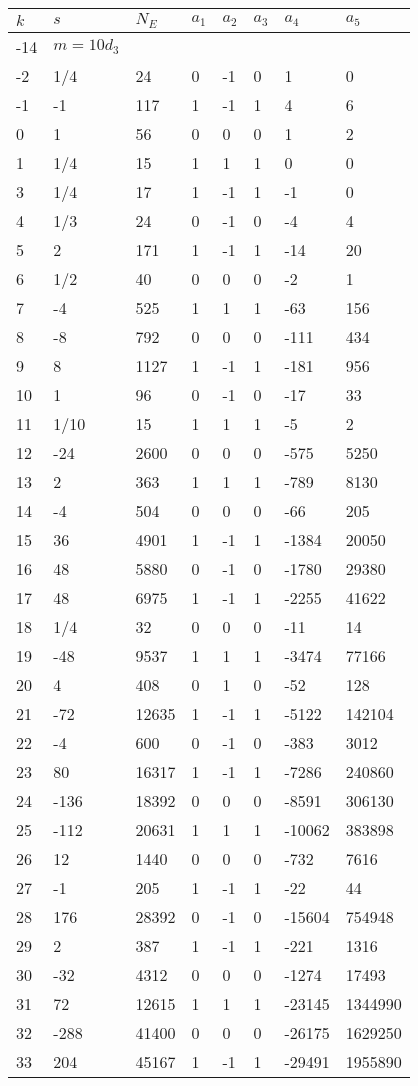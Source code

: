 \documentclass{amsart}
\begin{document}
\begin{longtable}{|l|l|l|lllll|}
\hline
$k$ & $s$ & $N_E$ & $a_1$ & $a_2$ & $a_3$ & $a_4$ & $a_5$\\
\hline
-14&$m=10d_{3}$&&\multicolumn{5}{c|}{}\\
-2&1/4&24&0&-1&0&1&0\\
-1&-1&117&1&-1&1&4&6\\
0&1&56&0&0&0&1&2\\
1&1/4&15&1&1&1&0&0\\
3&1/4&17&1&-1&1&-1&0\\
4&1/3&24&0&-1&0&-4&4\\
5&2&171&1&-1&1&-14&20\\
6&1/2&40&0&0&0&-2&1\\
7&-4&525&1&1&1&-63&156\\
8&-8&792&0&0&0&-111&434\\
9&8&1127&1&-1&1&-181&956\\
10&1&96&0&-1&0&-17&33\\
11&1/10&15&1&1&1&-5&2\\
12&-24&2600&0&0&0&-575&5250\\
13&2&363&1&1&1&-789&8130\\
14&-4&504&0&0&0&-66&205\\
15&36&4901&1&-1&1&-1384&20050\\
16&48&5880&0&-1&0&-1780&29380\\
17&48&6975&1&-1&1&-2255&41622\\
18&1/4&32&0&0&0&-11&14\\
19&-48&9537&1&1&1&-3474&77166\\
20&4&408&0&1&0&-52&128\\
21&-72&12635&1&-1&1&-5122&142104\\
22&-4&600&0&-1&0&-383&3012\\
23&80&16317&1&-1&1&-7286&240860\\
24&-136&18392&0&0&0&-8591&306130\\
25&-112&20631&1&1&1&-10062&383898\\
26&12&1440&0&0&0&-732&7616\\
27&-1&205&1&-1&1&-22&44\\
28&176&28392&0&-1&0&-15604&754948\\
29&2&387&1&-1&1&-221&1316\\
30&-32&4312&0&0&0&-1274&17493\\
31&72&12615&1&1&1&-23145&1344990\\
32&-288&41400&0&0&0&-26175&1629250\\
33&204&45167&1&-1&1&-29491&1955890\\

\end{longtable}
\end{document}
